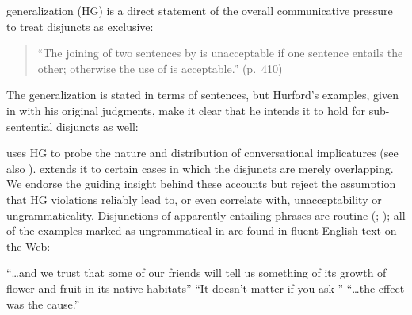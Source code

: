 \documentclass[12pt,twoside]{article}
\renewcommand{\_}{\textbf{\textunderscore\hspace{-4pt}\textunderscore\hspace{-3pt}\textunderscore\hspace{-4pt}\textunderscore}\hspace{0.5pt}}			%
\begin{document}
 generalization (HG) is a direct statement of
the overall communicative pressure to treat disjuncts as exclusive:
%
\begin{quote}
  ``The joining of two sentences by  is unacceptable if one
  sentence entails the other; otherwise the use of  is
  acceptable.'' (p.~410)
\end{quote}
%
The generalization is stated in terms of sentences, but Hurford's
examples, given in  with his original judgments, make it clear
that he intends it to hold for sub-sentential disjuncts as well:
%
\begin{exe}
\ex\label{hex}
  \begin{xlist}
  \end{xlist}
\end{exe}

\citeauthor{Hurford:1974} uses HG to probe the nature and distribution
of conversational implicatures (see also
\citealt{Gazdar79b,ChierchiaFoxSpector08}). \citet{Singh:2008} extends
it to certain cases in which the disjuncts are merely overlapping. We
endorse the guiding insight behind these accounts but reject the
assumption that HG violations reliably lead to, or even correlate
with, unacceptability or ungrammaticality. Disjunctions of apparently
entailing phrases are routine (\citealt{Simons:2001};
); all of the examples marked as
ungrammatical in  are found in fluent English text on the Web:
%
\begin{exe}
\ex\label{hex-good}
  \begin{xlist}
  \ex ``\ldots and we trust that some of our  friends will tell us something of its growth of
    flower and fruit in its native habitats''
  \ex ``It doesn't matter if you ask ''
  \ex ``\ldots the effect was 
    the cause.''
  \end{xlist}
\end{exe}
\end{document}
